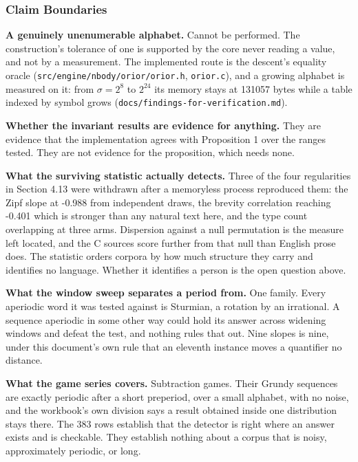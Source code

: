 \subsubsection{Claim Boundaries}

\textbf{A genuinely unenumerable alphabet.} Cannot be performed. The construction's tolerance of one is supported by the core never reading a value, and not by a measurement. The implemented route is the descent's equality oracle (\texttt{src/\allowbreak{}engine/\allowbreak{}nbody/\allowbreak{}orior/\allowbreak{}orior.h}, \texttt{orior.c}), and a growing alphabet is measured on it: from \(\sigma = 2^8\) to \(2^{24}\) its memory stays at 131057 bytes while a table indexed by symbol grows (\texttt{docs/\allowbreak{}findings-\allowbreak{}for-\allowbreak{}verification.md}).

\textbf{Whether the invariant results are evidence for anything.} They are evidence that the implementation agrees with Proposition 1 over the ranges tested. They are not evidence for the proposition, which needs none.

\textbf{What the surviving statistic actually detects.} Three of the four regularities in Section 4.13 were withdrawn after a memoryless process reproduced them: the Zipf slope at -0.988 from independent draws, the brevity correlation reaching -0.401 which is stronger than any natural text here, and the type count overlapping at three arms. Dispersion against a null permutation is the measure left located, and the C sources score further from that null than English prose does. The statistic orders corpora by how much structure they carry and identifies no language. Whether it identifies a person is the open question above.

\textbf{What the window sweep separates a period from.} One family. Every aperiodic word it was tested against is Sturmian, a rotation by an irrational. A sequence aperiodic in some other way could hold its answer across widening windows and defeat the test, and nothing rules that out. Nine slopes is nine, under this document's own rule that an eleventh instance moves a quantifier no distance.

\textbf{What the game series covers.} Subtraction games. Their Grundy sequences are exactly periodic after a short preperiod, over a small alphabet, with no noise, and the workbook's own division says a result obtained inside one distribution stays there. The 383 rows establish that the detector is right where an answer exists and is checkable. They establish nothing about a corpus that is noisy, approximately periodic, or long.

